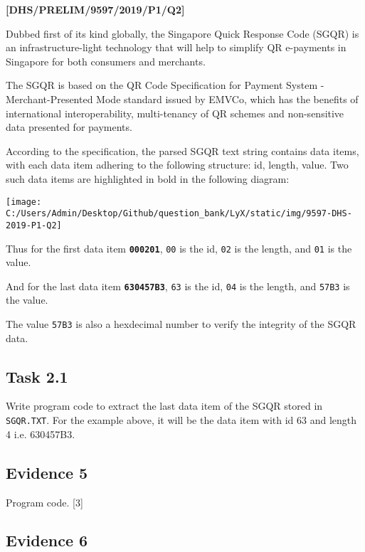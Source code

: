 \item \textbf{{[}DHS/PRELIM/9597/2019/P1/Q2{]} }

Dubbed first of its kind globally, the Singapore Quick Response Code
(SGQR) is an infrastructure-light technology that will help to simplify
QR e-payments in Singapore for both consumers and merchants. 

The SGQR is based on the QR Code Specification for Payment System
- Merchant-Presented Mode standard issued by EMVCo, which has the
benefits of international interoperability, multi-tenancy of QR schemes
and non-sensitive data presented for payments. 

According to the specification, the parsed SGQR text string contains
data items, with each data item adhering to the following structure:
id, length, value. Two such data items are highlighted in bold in
the following diagram: 
\begin{center}
\texttt{[image: C:/Users/Admin/Desktop/Github/question\_bank/LyX/static/img/9597-DHS-2019-P1-Q2]}
\par\end{center}

Thus for the first data item \texttt{\textbf{000201}}, \texttt{00}
is the id, \texttt{02} is the length, and \texttt{01} is the value. 

And for the last data item \texttt{\textbf{630457B3}}, \texttt{63}
is the id, \texttt{04} is the length, and \texttt{57B3} is the value. 

The value \texttt{57B3} is also a hexdecimal number to verify the
integrity of the SGQR data. 

\subsection*{Task 2.1 }

Write program code to extract the last data item of the SGQR stored
in \texttt{SGQR.TXT}. For the example above, it will be the data item
with id 63 and length 4 i.e. 630457B3. 

\subsection*{Evidence 5 }

Program code. \hfill{} {[}3{]}

\subsection*{Evidence 6 }

